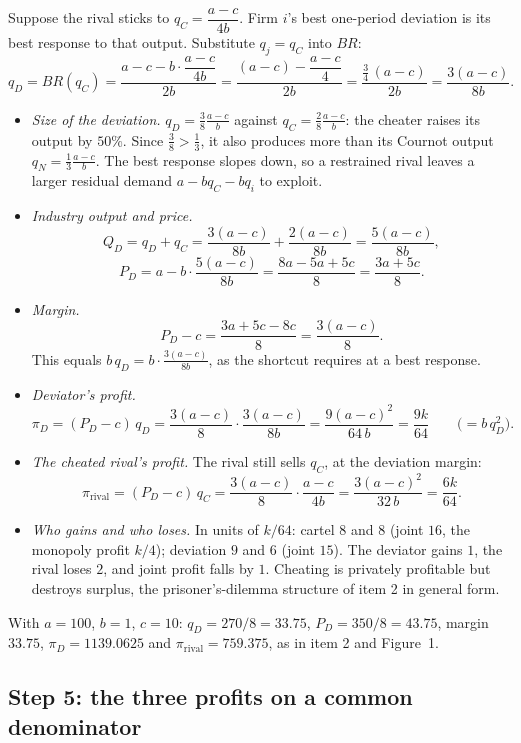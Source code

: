 \documentclass[11pt,a4paper]{article}
\begin{document}
Suppose the rival sticks to $q_C = \dfrac{a-c}{4b}$. Firm $i$'s best one-period deviation is its best
response to that output. Substitute $q_j = q_C$ into $BR$:
\[
q_D = BR(q_C) = \frac{a - c - b\cdot\dfrac{a-c}{4b}}{2b}
= \frac{(a - c) - \dfrac{a-c}{4}}{2b}
= \frac{\tfrac34\,(a-c)}{2b}
= \frac{3(a-c)}{8b}.
\]
\begin{itemize}
\item \emph{Size of the deviation.} $q_D = \tfrac{3}{8}\tfrac{a-c}{b}$ against $q_C = \tfrac{2}{8}\tfrac{a-c}{b}$:
the cheater raises its output by $50\%$. Since $\tfrac38 > \tfrac13$, it also produces more than its
Cournot output $q_N = \tfrac13\tfrac{a-c}{b}$. The best response slopes down, so a restrained rival
leaves a larger residual demand $a - b q_C - bq_i$ to exploit.
\item \emph{Industry output and price.}
\[
Q_D = q_D + q_C = \frac{3(a-c)}{8b} + \frac{2(a-c)}{8b} = \frac{5(a-c)}{8b},
\]
\[
P_D = a - b\cdot\frac{5(a-c)}{8b} = \frac{8a - 5a + 5c}{8} = \frac{3a + 5c}{8}.
\]
\item \emph{Margin.}
\[
P_D - c = \frac{3a + 5c - 8c}{8} = \frac{3(a-c)}{8}.
\]
This equals $b\,q_D = b\cdot\tfrac{3(a-c)}{8b}$, as the shortcut requires at a best response.
\item \emph{Deviator's profit.}
\[
\pi_D = (P_D - c)\,q_D = \frac{3(a-c)}{8}\cdot\frac{3(a-c)}{8b} = \frac{9(a-c)^2}{64\,b} = \frac{9k}{64}
\qquad\bigl(= b\,q_D^2\bigr).
\]
\item \emph{The cheated rival's profit.} The rival still sells $q_C$, at the deviation margin:
\[
\pi_{\text{rival}} = (P_D - c)\,q_C = \frac{3(a-c)}{8}\cdot\frac{a-c}{4b} = \frac{3(a-c)^2}{32\,b} = \frac{6k}{64}.
\]
\item \emph{Who gains and who loses.} In units of $k/64$: cartel $8$ and $8$ (joint $16$, the monopoly
profit $k/4$); deviation $9$ and $6$ (joint $15$). The deviator gains $1$, the rival loses $2$, and joint
profit falls by $1$. Cheating is privately profitable but destroys surplus, the prisoner's-dilemma
structure of item 2 in general form.
\end{itemize}
With $a = 100$, $b = 1$, $c = 10$: $q_D = 270/8 = 33.75$, $P_D = 350/8 = 43.75$, margin $33.75$,
$\pi_D = 1139.0625$ and $\pi_{\text{rival}} = 759.375$, as in item 2 and Figure~1.

\subsection*{Step 5: the three profits on a common denominator}
\end{document}
